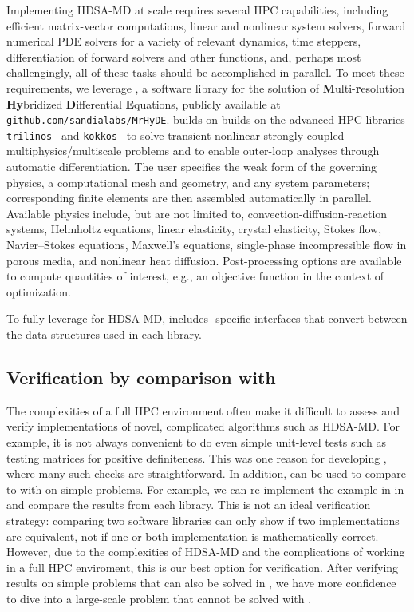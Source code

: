 Implementing HDSA-MD at scale requires several HPC capabilities, including efficient matrix-vector computations, linear and nonlinear system solvers, forward numerical PDE solvers for a variety of relevant dynamics, time steppers, differentiation of forward solvers and other functions, and, perhaps most challengingly, all of these tasks should be accomplished in parallel.
To meet these requirements, we leverage \MrHyDE, a software library for the solution of \textbf{M}ulti-\textbf{r}esolution \textbf{Hy}bridized \textbf{D}ifferential \textbf{E}quations, publicly available at \href{https://github.com/sandialabs/MrHyDE}{\texttt{github.com/sandialabs/MrHyDE}}.
\MrHyDE builds on builds on the advanced \cpp HPC libraries \texttt{trilinos}~\cite{trilinos2020} and \texttt{kokkos}~\cite{edwards2014kokkos,trott2022kokkos} to solve transient nonlinear strongly coupled multiphysics/multiscale problems and to enable outer-loop analyses through automatic differentiation.
The user specifies the weak form of the governing physics, a computational mesh and geometry, and any system parameters; corresponding finite elements are then assembled automatically in parallel.
Available physics include, but are not limited to, convection-diffusion-reaction systems, Helmholtz equations, linear elasticity, crystal elasticity, Stokes flow, Navier--Stokes equations, Maxwell's equations, single-phase incompressible flow in porous media, and nonlinear heat diffusion.
Post-processing options are available to compute quantities of interest, e.g., an objective function in the context of optimization.

To fully leverage \MrHyDE for HDSA-MD, \HdsaLib includes \MrHyDE-specific interfaces that convert between the data structures used in each library.

\subsection{Verification by comparison with \SABL}

The complexities of a full HPC environment often make it difficult to assess and verify implementations of novel, complicated algorithms such as HDSA-MD.
For example, it is not always convenient to do even simple unit-level tests such as testing matrices for positive definiteness.
This was one reason for developing \SABL, where many such checks are straightforward.
In addition, \SABL can be used to compare to \HdsaLib with \MrHyDE on simple problems.
For example, we can re-implement the example in  in \HdsaLib and compare the results from each library.
This is not an ideal verification strategy: comparing two software libraries can only show if two implementations are equivalent, not if one or both implementation is mathematically correct.
However, due to the complexities of HDSA-MD and the complications of working in a full HPC enviroment, this is our best option for verification.
After verifying results on simple problems that can also be solved in \SABL, we have more confidence to dive into a large-scale problem that cannot be solved with \SABL.

